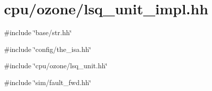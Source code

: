 \hypertarget{ozone_2lsq__unit__impl_8hh}{
\section{cpu/ozone/lsq\_\-unit\_\-impl.hh}
\label{ozone_2lsq__unit__impl_8hh}
}
{\ttfamily \#include \char`\"{}base/str.hh\char`\"{}}\par
{\ttfamily \#include \char`\"{}config/the\_\-isa.hh\char`\"{}}\par
{\ttfamily \#include \char`\"{}cpu/ozone/lsq\_\-unit.hh\char`\"{}}\par
{\ttfamily \#include \char`\"{}sim/fault\_\-fwd.hh\char`\"{}}\par
